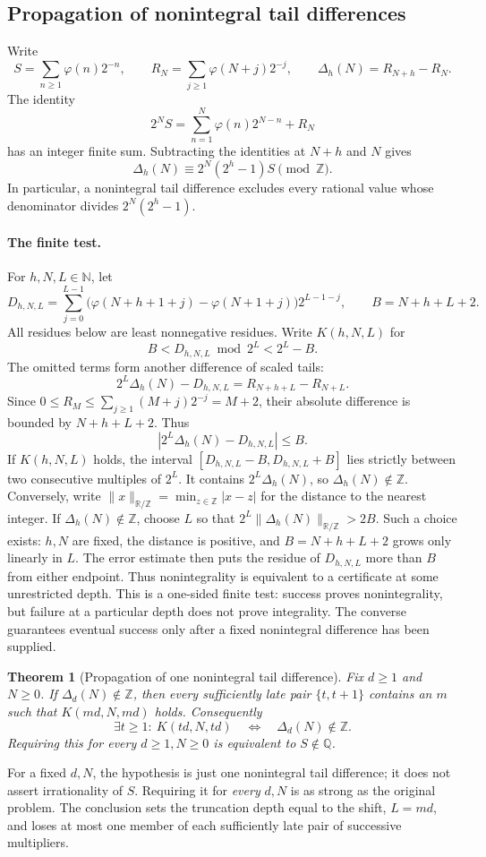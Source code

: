 \documentclass[11pt]{article}
\theoremstyle{plain}
\newtheorem{theorem}[thm]{Theorem}
\theoremstyle{definition}
\theoremstyle{remark}
\newcommand{\N}{\mathbb{N}}
\newcommand{\Z}{\mathbb{Z}}
\newcommand{\Q}{\mathbb{Q}}
\newcommand{\R}{\mathbb{R}}
\newcommand{\ph}{\varphi}
\begin{document}
\subsection{Propagation of nonintegral tail differences}\label{long249:r3-ray}
Write
\[
 S=\sum_{n\ge1}\ph(n)2^{-n},\qquad
 R_N=\sum_{j\ge1}\ph(N+j)2^{-j},\qquad
 \Delta_h(N)=R_{N+h}-R_N.
\]
The identity
\[
 2^NS=\sum_{n=1}^N\ph(n)2^{N-n}+R_N
\]
has an integer finite sum. Subtracting the identities at $N+h$ and $N$
gives
\begin{equation}\label{long249:r3-tail-phase}
 \Delta_h(N)\equiv2^N(2^h-1)S\pmod\Z.
\end{equation}
In particular, a nonintegral tail difference excludes every
rational value whose denominator divides $2^N(2^h-1)$.
\paragraph{The finite test.}
For $h,N,L\in\N$, let
\[
 D_{h,N,L}=\sum_{j=0}^{L-1}
   \bigl(\ph(N+h+1+j)-\ph(N+1+j)\bigr)2^{L-1-j},
 \qquad B=N+h+L+2.
\]
All residues below are least nonnegative residues. Write $K(h,N,L)$ for
\[
 B<D_{h,N,L}\bmod2^L<2^L-B.
\]
The omitted terms form another difference of scaled tails:
\[
 2^L\Delta_h(N)-D_{h,N,L}=R_{N+h+L}-R_{N+L}.
\]
Since $0\le R_M\le\sum_{j\ge1}(M+j)2^{-j}=M+2$, their absolute
difference is bounded by $N+h+L+2$.
Thus
\begin{equation}\label{long249:r3-tail-error}
 |2^L\Delta_h(N)-D_{h,N,L}|\le B.
\end{equation}
If $K(h,N,L)$ holds, the interval
$[D_{h,N,L}-B,D_{h,N,L}+B]$ lies strictly between two consecutive
multiples of $2^L$. It contains $2^L\Delta_h(N)$, so
$\Delta_h(N)\notin\Z$.
Conversely, write $\|x\|_{\R/\Z}=\min_{z\in\Z}|x-z|$ for the distance to
the nearest integer. If $\Delta_h(N)\notin\Z$, choose $L$ so that
$2^L\|\Delta_h(N)\|_{\R/\Z}>2B$. Such a choice exists: $h,N$ are fixed,
the distance is positive, and $B=N+h+L+2$ grows only linearly in $L$.
The error estimate then puts the residue of $D_{h,N,L}$ more than $B$
from either endpoint. Thus nonintegrality is equivalent to a certificate
at some unrestricted depth. This is a one-sided finite test: success
proves nonintegrality, but failure at a particular depth does not prove
integrality. The converse guarantees eventual success only after a
fixed nonintegral difference has been supplied.

\begin{theorem}[Propagation of one nonintegral tail difference]\label{res:fulldepth}
Fix $d\ge1$ and $N\ge0$. If $\Delta_d(N)\notin\Z$, then every sufficiently
late pair $\{t,t+1\}$ contains an $m$ such that $K(md,N,md)$ holds.
Consequently
\[
 \exists t\ge1:\ K(td,N,td)
 \quad\Longleftrightarrow\quad\Delta_d(N)\notin\Z.
\]
Requiring this for every $d\ge1,N\ge0$ is equivalent to $S\notin\Q$.
\end{theorem}
For a fixed $d,N$, the hypothesis is just one nonintegral tail difference;
it does not assert irrationality of $S$. Requiring it for \emph{every}
$d,N$ is as strong as the original problem. The conclusion sets the
truncation depth equal to the shift, $L=md$, and loses at most one member
of each sufficiently late pair of successive multipliers.
\end{document}
